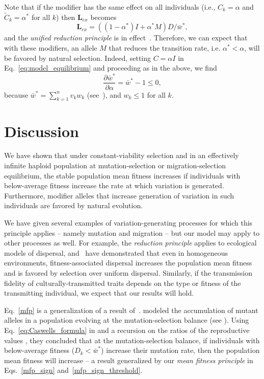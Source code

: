 \documentclass[9pt, a4paper, twocolumn]{extarticle}
\newcommand{\cl}{\mathbf{L}}
\begin{document}
Note that if the modifier has the same effect on all individuals (i.e., $C_k = \alpha$ and $\tilde{C}_k = \alpha^*$ for all $k$) then $\cl_{ex}$ becomes
\begin{equation}
\cl_{ex} = ((1 - \alpha^*)I + \alpha^* M) D /\bar{w}^*,
\end{equation}  
and the \emph{unified reduction principle} is in effect~\cite[eqs. 65, 72]{Altenberg2017}.
Therefore, we can expect that with these modifiers, an allele $M$ that reduces the transition rate, i.e. $\alpha^* < \alpha$, will be favored by natural selection.
Indeed, setting $C = \alpha I$ in Eq.~\ref{eq:model_equilibrium} and proceeding as in the above, we find
$$
\frac{\partial \bar{w}^*}{\partial \alpha} = 
\bar{w}^* - 1 \le 0,
$$
because $\bar{w}^* = \sum_{k=1}^{n}{v_k w_k}$ (see~), and $w_k \le 1$ for all $k$.


\section*{Discussion}

We have shown that under constant-viability selection and in an effectively infinite haploid population at mutation-selection or migration-selection equilibrium, the stable population mean fitness increases if individuals with below-average fitness increase the rate at which variation is generated. Furthermore, modifier alleles that  increase generation of variation in such individuals are favored by natural evolution.

We have given several examples of variation-generating processes for which this principle applies -- namely mutation and migration -- but our model may apply to other processes as well.
For example, the \emph{reduction principle} applies to ecological models of dispersal, and~\citet{Gueijman2013} have demonstrated that even in homogeneous environments, fitness-associated dispersal increases the population mean fitness and is favored by selection over uniform dispersal.
Similarly, if the transmission fidelity of culturally-transmitted traits depends on the type or fitness of the transmitting individual, we expect that our results will hold.

Eq.~\ref{mfp} is a generalization of a result of~\citet[Eq.~4]{Ram2012}.
\citeauthor{Ram2012} modeled the accumulation of mutant alleles in a population evolving at the mutation-selection balance (see ).
Using Eq.~\ref{eq:Caswells_formula} in  and a recursion on the ratios of the reproductive values \cite[see][eqs.~A5-6]{Ram2012}, they concluded that at the mutation-selection balance, if individuals with below-average fitness ($D_k < \bar{w}^*$) increase their mutation rate, then the population mean fitness will increase -- a result generalized by our \emph{mean fitness principle} in Eqs.~\ref{mfp_sign} and~\ref{mfp_sign_threshold}.
\end{document}
